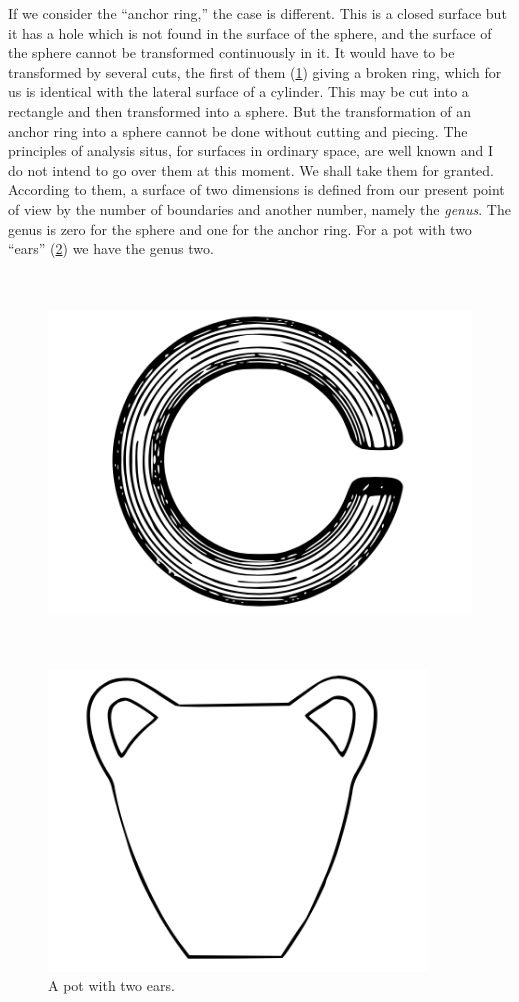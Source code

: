 \documentclass[12pt,oneside]{book}
\begin{document}
If we consider the ``anchor ring,'' the case is different. This is a closed
surface but it has a hole which is not found in the surface of the sphere, and
the surface of the sphere cannot be transformed continuously in it. It would
have to be transformed by several cuts, the first of them (\ref{Fig2}) giving a
broken ring, which for us is identical with the lateral surface of a cylinder.
This may be cut into a rectangle and then transformed into a sphere. But the
transformation of an anchor ring into a sphere cannot be done without cutting
and piecing. The principles of analysis situs, for surfaces in ordinary space,
are well known and I do not intend to go over them at this moment. We shall take
them for granted. According to them, a surface of two dimensions is defined from
our present point of view by the number of boundaries and another number, namely
the \textit{genus}. The genus is zero for the sphere and one for the anchor
ring. For a pot with two ``ears'' (\ref{Fig3}) we have the genus two. \par

\begin{figure}
    \centering
    \includegraphics[height=10cm]{Fig2.png}
    \caption{}
    \label{Fig2}
\end{figure}

\begin{figure}
    \centering
    \includegraphics[height=8cm]{Fig3.png}
    \caption{A pot with two ears.}
    \label{Fig3}
\end{figure}
\end{document}
